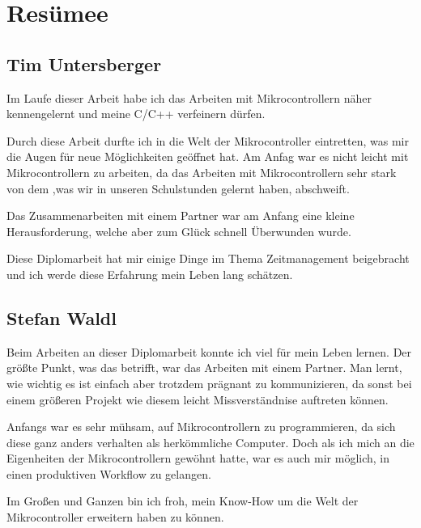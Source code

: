 \chapter{Resümee}

\section{Tim Untersberger}

Im Laufe dieser Arbeit habe ich das Arbeiten mit Mikrocontrollern näher kennengelernt und meine C/C++ verfeinern dürfen.

Durch diese Arbeit durfte ich in die Welt der Mikrocontroller eintretten, was mir die Augen für neue Möglichkeiten geöffnet hat. Am Anfag war es nicht leicht mit Mikrocontrollern zu arbeiten, da das Arbeiten mit Mikrocontrollern sehr stark von dem ,was wir in unseren Schulstunden gelernt haben, abschweift.

Das Zusammenarbeiten mit einem Partner war am Anfang eine kleine Herausforderung, welche aber zum Glück schnell Überwunden wurde.

Diese Diplomarbeit hat mir einige Dinge im Thema Zeitmanagement beigebracht und ich werde diese Erfahrung mein Leben lang schätzen.

\section{Stefan Waldl}
Beim Arbeiten an dieser Diplomarbeit konnte ich viel für mein Leben lernen. Der größte Punkt, was das betrifft, war das Arbeiten mit einem Partner. Man lernt, wie wichtig es ist einfach aber trotzdem prägnant zu kommunizieren, da sonst bei einem größeren Projekt wie diesem leicht Missverständnise auftreten können.

Anfangs war es sehr mühsam, auf Mikrocontrollern zu programmieren, da sich diese ganz anders verhalten als herkömmliche Computer. Doch als ich mich an die Eigenheiten der Mikrocontrollern gewöhnt hatte, war es auch mir möglich, in einen produktiven Workflow zu gelangen.

Im Großen und Ganzen bin ich froh, mein Know-How um die Welt der Mikrocontroller erweitern haben zu können.
